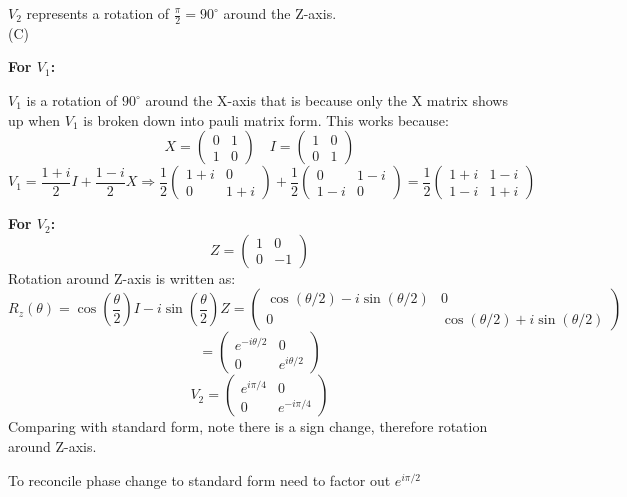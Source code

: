 \documentclass[12pt]{article}
\begin{document}
$V_2$ represents a rotation of $\frac{\pi}{2} = 90^\circ$ around the Z-axis.
\\
(C)

\textbf{For $V_1$:}

$V_1$ is a rotation  of $90^\circ$ around the X-axis that is because only the X matrix shows up when $V_1$ is broken down into pauli matrix form. This works because:
\[
    X = \begin{pmatrix} 0 & 1 \\ 1 & 0 \end{pmatrix} \quad I = \begin{pmatrix} 1 & 0 \\ 0 & 1 \end{pmatrix}
\]
\[
    V_1 = \frac{1+i}{2} I + \frac{1-i}{2} X \Rightarrow \frac{1}{2} \begin{pmatrix} 1+i & 0 \\ 0 & 1+i \end{pmatrix} + \frac{1}{2} \begin{pmatrix} 0 & 1-i \\ 1-i & 0 \end{pmatrix} = \frac{1}{2} \begin{pmatrix} 1+i & 1-i \\ 1-i & 1+i \end{pmatrix}
\]

\textbf{For $V_2$:}
\[
    Z = \begin{pmatrix} 1 & 0 \\ 0 & -1 \end{pmatrix}
\]
Rotation around Z-axis is written as:
\[
    R_z(\theta) = \cos\left(\frac{\theta}{2}\right)I - i\sin\left(\frac{\theta}{2}\right)Z = \begin{pmatrix} \cos(\theta/2)-i\sin(\theta/2) & 0 \\ 0 & \cos(\theta/2)+i\sin(\theta/2) \end{pmatrix}
\]
\[
    = \begin{pmatrix} e^{-i\theta/2} & 0 \\ 0 & e^{i\theta/2} \end{pmatrix}
\]
\[
    V_2 = \begin{pmatrix} e^{i\pi/4} & 0 \\ 0 & e^{-i\pi/4} \end{pmatrix}
\]
Comparing with standard form, note there is a sign change, therefore rotation around Z-axis.

To reconcile phase change to standard form need to factor out $e^{i\pi/2}$
\end{document}
